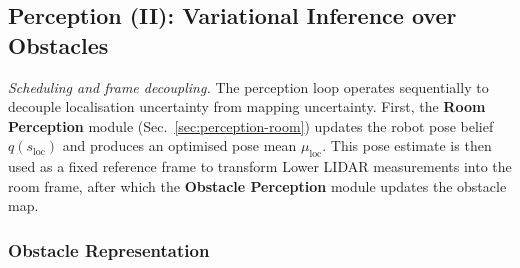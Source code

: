 \documentclass[a4paper, twoside]{article}
\begin{document}





\subsection{Perception (II): Variational Inference over Obstacles}
\label{sec:perception-obstacles}

\textit{Scheduling and frame decoupling.}
The perception loop operates sequentially to decouple localisation uncertainty from
mapping uncertainty. First, the \textbf{Room Perception} module (Sec.~\ref{sec:perception-room})
updates the robot pose belief $q(s_{\text{loc}})$ and produces an optimised pose mean
$\mu_{\text{loc}}$. This pose estimate is then used as a fixed reference frame to
transform Lower LIDAR measurements into the room frame, after which the
\textbf{Obstacle Perception} module updates the obstacle map.

\subsubsection{Obstacle Representation}
\label{sec:obstacle-representation}
\end{document}
